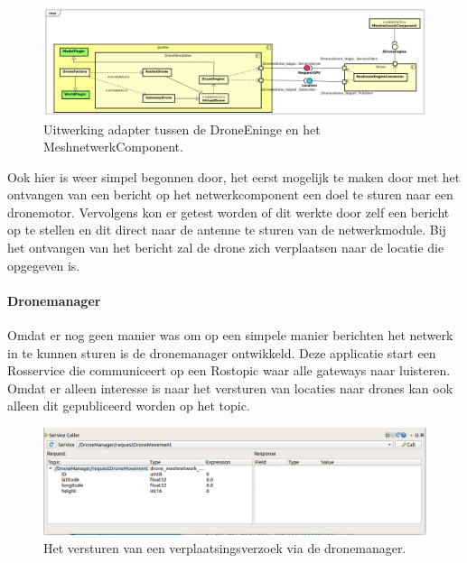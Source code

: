 \documentclass[a4paper, 11pt, oneside]{report}
\begin{document}
\begin{figure}[H]
	\begin{center}\includegraphics[width=1\linewidth]{Afbeeldingen/RosEngineAdapater.png}\end{center}
	\caption{Uitwerking adapter tussen de DroneEninge en het MeshnetwerkComponent.}
	\label{fig:adapter}
\end{figure}

Ook hier is weer simpel begonnen door, het eerst mogelijk te maken door met het ontvangen van een bericht op het netwerkcomponent een doel te sturen naar een dronemotor. Vervolgens kon er getest worden of dit werkte door zelf een bericht op te stellen en dit direct naar de antenne te sturen van de netwerkmodule. 
Bij het ontvangen van het bericht zal de drone zich verplaatsen naar de locatie die opgegeven is.

\paragraph{Dronemanager}
Omdat er nog geen manier was om op een simpele manier berichten het netwerk in te kunnen sturen is de dronemanager ontwikkeld. Deze applicatie start een Rosservice die communiceert op een Rostopic waar alle gateways naar luisteren. Omdat er alleen interesse is naar het versturen van locaties naar drones kan ook alleen dit gepubliceerd worden op het topic.
\begin{figure}[H]
	\begin{center}\includegraphics[width=1\linewidth]{Afbeeldingen/LocationMessageRQT.png}\end{center}
	\caption{Het versturen van een verplaatsingsverzoek via de dronemanager.}
	\label{fig:serviccaller}
\end{figure}
\end{document}
